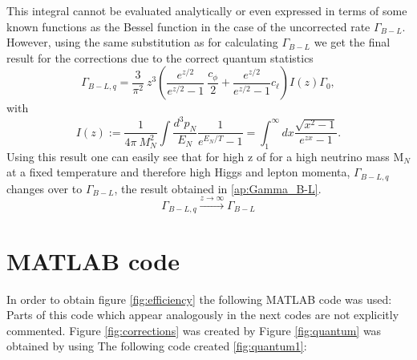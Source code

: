 This integral cannot be evaluated analytically or even expressed in terms of some known functions as the Bessel function in the case of the uncorrected rate $\Gamma_{B-L}$. However, using the same substitution as for calculating $\Gamma_{B-L}$ we get the final result for the corrections due to the correct quantum statistics
\begin{equation*}
	\Gamma_{B-L,q}=\frac{3}{\pi^2}\:z^3\left(\frac{e^{z/2}}{e^{z/2}-1}\:\frac{c_\phi}{2}+\frac{e^{z/2}}{e^{z/2}-1}c_\ell\right)I(z)\Gamma_0,
\end{equation*}
with 
\begin{equation*}
	I(z):=\frac{1}{4\pi\: M_N^2}\int \frac{d^3p_N}{E_N}\frac{1}{e^{E_N/T}-1}=\int_{1}^{\infty}dx\frac{\sqrt{x^2-1}}{e^{zx}-1}.
\end{equation*}
Using this result one can easily see that for high z of for a high neutrino mass M$_N$ at a fixed temperature and therefore high Higgs and lepton momenta, $\Gamma_{B-L,q}$ changes over to $\Gamma_{B-L}$, the result obtained in \ref{ap:Gamma_B-L}.
\begin{equation*}
	\Gamma_{B-L,q}\overset{z\rightarrow\infty}{\longrightarrow}\Gamma_{B-L}
\end{equation*}
\newpage
\section{MATLAB code}
\label{ap:matlab}
In order to obtain figure \ref{fig:efficiency} the following MATLAB code was used:
 Parts of this code which appear analogously in the next codes are not explicitly commented.
\newpage\noindent
Figure \ref{fig:corrections} was created by
\newpage\noindent
Figure \ref{fig:quantum} was obtained by using
\newpage\noindent
The following code created \ref{fig:quantum1}:


